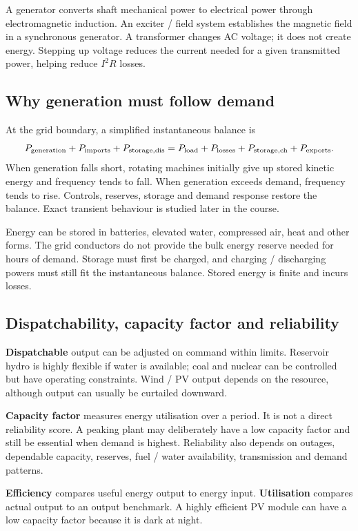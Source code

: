 \documentclass[11pt,a4paper]{article}
\newenvironment{Caution}[1]{\begin{tcolorbox}[colback=warm,colframe=rust,coltitle=white,title={#1}]}{\end{tcolorbox}}
\begin{document}
A generator converts shaft mechanical power to electrical power through electromagnetic induction. An exciter / field system establishes the magnetic field in a synchronous generator. A transformer changes AC voltage; it does not create energy. Stepping up voltage reduces the current needed for a given transmitted power, helping reduce $I^2R$ losses.

\subsection{Why generation must follow demand}
At the grid boundary, a simplified instantaneous balance is
\[
P_{\rm generation}+P_{\rm imports}+P_{\rm storage,dis}
=P_{\rm load}+P_{\rm losses}+P_{\rm storage,ch}+P_{\rm exports}.
\]
When generation falls short, rotating machines initially give up stored kinetic energy and frequency tends to fall. When generation exceeds demand, frequency tends to rise. Controls, reserves, storage and demand response restore the balance. Exact transient behaviour is studied later in the course.

\begin{Caution}{Interpret ``power cannot be stored'' correctly}
Energy can be stored in batteries, elevated water, compressed air, heat and other forms. The grid conductors do not provide the bulk energy reserve needed for hours of demand. Storage must first be charged, and charging / discharging powers must still fit the instantaneous balance. Stored energy is finite and incurs losses.
\end{Caution}

\subsection{Dispatchability, capacity factor and reliability}
\textbf{Dispatchable} output can be adjusted on command within limits. Reservoir hydro is highly flexible if water is available; coal and nuclear can be controlled but have operating constraints. Wind / PV output depends on the resource, although output can usually be curtailed downward.

\textbf{Capacity factor} measures energy utilisation over a period. It is not a direct reliability score. A peaking plant may deliberately have a low capacity factor and still be essential when demand is highest. Reliability also depends on outages, dependable capacity, reserves, fuel / water availability, transmission and demand patterns.

\textbf{Efficiency} compares useful energy output to energy input. \textbf{Utilisation} compares actual output to an output benchmark. A highly efficient PV module can have a low capacity factor because it is dark at night.
\end{document}
